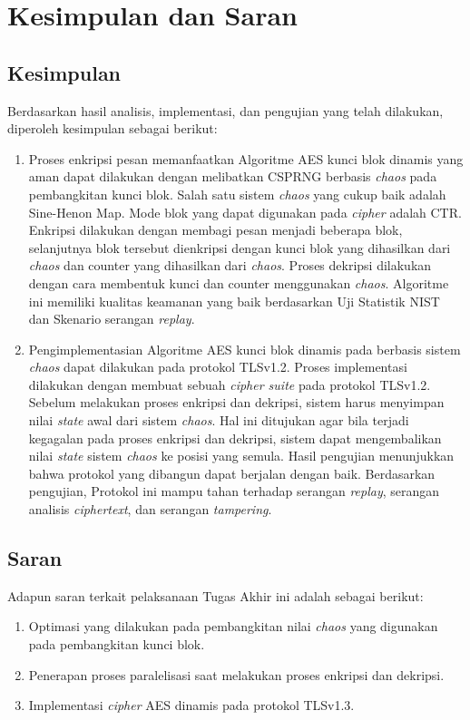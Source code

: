 \chapter{Kesimpulan dan Saran}

\section{Kesimpulan}
Berdasarkan hasil analisis, implementasi, dan pengujian yang telah dilakukan, diperoleh kesimpulan sebagai berikut:
\begin{enumerate}
  \item Proses enkripsi pesan memanfaatkan Algoritme AES kunci blok dinamis yang aman dapat dilakukan dengan melibatkan CSPRNG berbasis \emph{chaos} pada pembangkitan kunci blok. Salah satu sistem \emph{chaos} yang cukup baik adalah Sine-Henon Map. Mode blok yang dapat digunakan pada \emph{cipher} adalah CTR. Enkripsi dilakukan dengan membagi pesan menjadi beberapa blok, selanjutnya blok tersebut dienkripsi dengan kunci blok yang dihasilkan dari \emph{chaos} dan counter yang dihasilkan dari \emph{chaos}. Proses dekripsi dilakukan dengan cara membentuk kunci dan counter menggunakan \emph{chaos}. Algoritme ini memiliki kualitas keamanan yang baik berdasarkan Uji Statistik NIST dan Skenario serangan \emph{replay}.
  \item Pengimplementasian Algoritme AES kunci blok dinamis pada berbasis sistem \emph{chaos} dapat dilakukan pada protokol TLSv1.2. Proses implementasi dilakukan dengan membuat sebuah \emph{cipher suite} pada protokol TLSv1.2. Sebelum melakukan proses enkripsi dan dekripsi, sistem harus menyimpan nilai \emph{state} awal dari sistem \emph{chaos}. Hal ini ditujukan agar bila terjadi kegagalan pada proses enkripsi dan dekripsi, sistem dapat mengembalikan nilai \emph{state} sistem \emph{chaos} ke posisi yang semula. Hasil pengujian menunjukkan bahwa protokol yang dibangun dapat berjalan dengan baik. Berdasarkan pengujian, Protokol ini mampu tahan terhadap serangan \emph{replay}, serangan analisis \emph{ciphertext}, dan serangan \emph{tampering}.
\end{enumerate}

\section{Saran}
Adapun saran terkait pelaksanaan Tugas Akhir ini adalah sebagai berikut:
\begin{enumerate}
  \item Optimasi yang dilakukan pada pembangkitan nilai \emph{chaos} yang digunakan pada pembangkitan kunci blok.
  \item Penerapan proses paralelisasi saat melakukan proses enkripsi dan dekripsi.
  \item Implementasi \emph{cipher} AES dinamis pada protokol TLSv1.3. 
\end{enumerate}